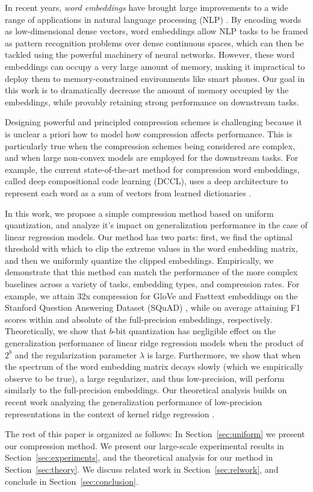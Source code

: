 In recent years, \textit{word embeddings} \citep{glove,word2vec} have brought large improvements to a wide range of applications in natural language processing (NLP) \citep{examples}.
By encoding words as low-dimensional dense vectors, word embeddings allow NLP tasks to be framed as pattern recognition problems over dense continuous spaces, which can then be tackled using the powerful machinery of neural networks.
However, these word embeddings can occupy a very large amount of memory, making it impractical to deploy them to memory-constrained environments like smart phones.
Our goal in this work is to dramatically decrease the amount of memory occupied by the embeddings, while provably retaining strong performance on downstream tasks.

Designing powerful and principled compression schemes is challenging because it is unclear a priori how to model how compression affects performance.
This is particularly true when the compression schemes being considered are complex, and when large non-convex models are employed for the downstream tasks.
For example, the current state-of-the-art method for compression word embeddings, called deep compositional code learning (DCCL), uses a deep architecture to represent each word as a sum of vectors from learned dictionaries \citep{dccl}.

In this work, we propose a simple compression method based on uniform quantization, and analyze it's impact on generalization performance in the case of linear regression models.
Our method has two parts: first, we find the optimal threshold with which to clip the extreme values in the word embedding matrix, and then we uniformly quantize the clipped embeddings.
Empirically, we demonstrate that this method can match the performance of the more complex baselines across a variety of tasks, embedding types, and compression rates.
For example, we attain 32x compression for GloVe and Fasttext embeddings on the Stanford Question Answering Dataset (SQuAD) \citep{x}, while on average attaining F1 scores within  and  absolute of the full-precision embeddings, respectively.
Theoretically, we show that $b$-bit quantization has negligible effect on the generalization performance of linear ridge regression models when the product of $2^b$ and the regularization parameter $\lambda$ is large.
Furthermore, we show that when the spectrum of the word embedding matrix decays slowly (which we empirically observe to be true), a large regularizer, and thus low-precision, will perform similarly to the full-precision embeddings.
Our theoretical analysis builds on recent work analyzing the generalization performance of low-precision representations in the context of kernel ridge regression \citep{our_work}.

The rest of this paper is organized as follows: In Section~\ref{sec:uniform} we present our compression method. We present our large-scale experimental results in Section~\ref{sec:experiments}, and the theoretical analysis for our method in Section~\ref{sec:theory}. We discuss related work in Section~\ref{sec:relwork}, and conclude in Section~\ref{sec:conclusion}.
